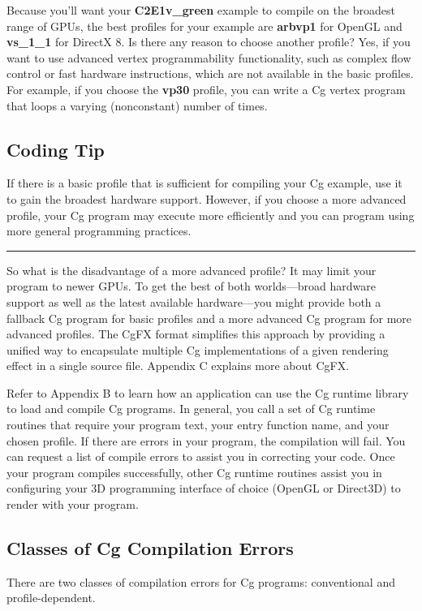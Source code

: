 \documentclass{book}
\begin{document}
Because you'll want your \textbf{C2E1v\_green} example to compile on the broadest range of GPUs, the best profiles for your example are \textbf{arbvp1} for OpenGL and \textbf{vs\_1\_1} for DirectX 8. Is there any reason to choose another profile? Yes, if you want to use advanced vertex programmability functionality, such as complex flow control or fast hardware instructions, which are not available in the basic profiles. For example, if you choose the \textbf{vp30} profile, you can write a Cg vertex program that loops a varying (nonconstant) number of times.

\subsection*{Coding Tip}

If there is a basic profile that is sufficient for compiling your Cg example, use it to gain the broadest hardware support. However, if you choose a more advanced profile, your Cg program may execute more efficiently and you can program using more general programming practices.
\hrule

So what is the disadvantage of a more advanced profile? It may limit your program to newer GPUs. To get the best of both worlds—broad hardware support as well as the latest available hardware—you might provide both a fallback Cg program for basic profiles and a more advanced Cg program for more advanced profiles. The CgFX format simplifies this approach by providing a unified way to encapsulate multiple Cg implementations of a given rendering effect in a single source file. Appendix C explains more about CgFX.

Refer to Appendix B to learn how an application can use the Cg runtime library to load and compile Cg programs. In general, you call a set of Cg runtime routines that require your program text, your entry function name, and your chosen profile. If there are errors in your program, the compilation will fail. You can request a list of compile errors to assist you in correcting your code. Once your program compiles successfully, other Cg runtime routines assist you in configuring your 3D programming interface of choice (OpenGL or Direct3D) to render with your program.

\subsection{Classes of Cg Compilation Errors}

There are two classes of compilation errors for Cg programs: conventional and profile-dependent.
\end{document}
